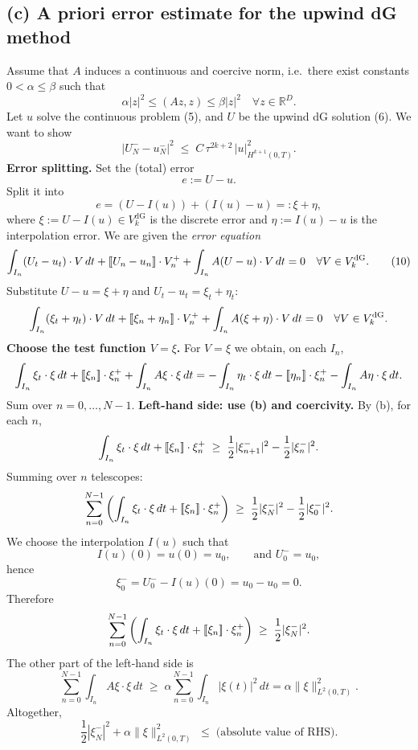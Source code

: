 \subsection*{(c) A priori error estimate for the upwind dG method}
Assume that $A$ induces a continuous and coercive norm, i.e.\ there exist constants
$0<\alpha\le\beta$ such that
\[
    \alpha|z|^2 \le (A z,z) \le \beta |z|^2 \quad\forall z\in\mathbb{R}^D.
\]
Let $u$ solve the continuous problem (5), and $U$ be the upwind dG solution (6).
We want to show
\[
    |U_N^- - u_N^-|^2 \;\le\; C\,\tau^{2k+2}\,|u|_{H^{k+1}(0,T)}^2. \tag{9}
\]
\textbf{Error splitting.}
Set the (total) error
\[
    e := U - u.
\]
Split it into
\[
    e = (U - I(u)) + (I(u) - u) =: \xi + \eta,
\]
where $\xi := U - I(u) \in V_k^{\mathrm{dG}}$ is the discrete error and
$\eta := I(u) - u$ is the interpolation error.
We are given the \emph{error equation}
\[
    \int_{I_n} (U_t - u_t)\cdot V\,dt
    + \left[\!\left[ U_n - u_n \right]\!\right]\cdot V_n^+
    + \int_{I_n} A (U - u)\cdot V\,dt
    = 0
    \quad\forall V\in V_k^{\mathrm{dG}}. \tag{10}
\]
Substitute $U - u = \xi + \eta$ and $U_t - u_t = \xi_t + \eta_t$:
\[
    \int_{I_n} (\xi_t + \eta_t)\cdot V\,dt
    + \left[\!\left[ \xi_n + \eta_n \right]\!\right]\cdot V_n^+
    + \int_{I_n} A (\xi + \eta)\cdot V\,dt
    = 0 \quad\forall V\in V_k^{\mathrm{dG}}.
\]
\textbf{Choose the test function $V = \xi$.}
For $V=\xi$ we obtain, on each $I_n$,
\[
    \int_{I_n} \xi_t\cdot \xi\,dt
    + \left[\!\left[ \xi_n \right]\!\right]\cdot \xi_n^+
    + \int_{I_n} A\xi\cdot\xi\,dt
    = -\int_{I_n} \eta_t\cdot \xi\,dt
    - \left[\!\left[ \eta_n \right]\!\right]\cdot \xi_n^+
    - \int_{I_n} A\eta\cdot\xi\,dt.
\]
Sum over $n=0,\dots,N-1$.
\textbf{Left-hand side: use (b) and coercivity.}
By (b), for each $n$,
\[
    \int_{I_n} \xi_t\cdot\xi\,dt
    + \left[\!\left[ \xi_n \right]\!\right]\cdot \xi_n^+
    \;\ge\;
    \frac12|\xi_{n+1}^-|^2 - \frac12|\xi_n^-|^2.
\]
Summing over $n$ telescopes:
\[
    \sum_{n=0}^{N-1}
    \left(
    \int_{I_n} \xi_t\cdot\xi\,dt
    + \left[\!\left[ \xi_n \right]\!\right]\cdot \xi_n^+
    \right)
    \;\ge\;
    \frac12|\xi_N^-|^2 - \frac12|\xi_0^-|^2.
\]
We choose the interpolation $I(u)$ such that
\[
    I(u)(0) = u(0) = u_0,\qquad\text{and }U_0^- = u_0,
\]
hence
\[
    \xi_0^- = U_0^- - I(u)(0) = u_0 - u_0 = 0.
\]
Therefore
\[
    \sum_{n=0}^{N-1}
    \left(
    \int_{I_n} \xi_t\cdot\xi\,dt
    + \left[\!\left[ \xi_n \right]\!\right]\cdot \xi_n^+
    \right)
    \;\ge\;
    \frac12|\xi_N^-|^2.
\]
The other part of the left-hand side is
\[
    \sum_{n=0}^{N-1} \int_{I_n} A\xi\cdot\xi\,dt
    \;\ge\;
    \alpha \sum_{n=0}^{N-1} \int_{I_n} |\xi(t)|^2\,dt
    = \alpha \|\xi\|_{L^2(0,T)}^2.
\]
Altogether,
\[
    \frac12|\xi_N^-|^2 + \alpha \|\xi\|_{L^2(0,T)}^2
    \;\le\; \text{(absolute value of RHS)}.
\]
